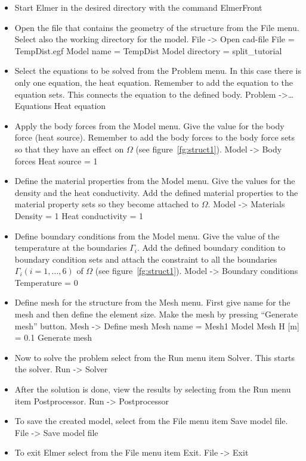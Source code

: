 \begin{itemize}
\item Start Elmer in the desired directory with the command
\ttbegin
ElmerFront
\ttend
\item Open the file that contains the geometry of the structure from 
the File menu. Select also the working directory for the model.
\ttbegin
File -> Open cad-file 
  File = TempDist.egf 
  Model name = TempDist 
  Model directory = split_tutorial
\ttend
\item Select the equations to be solved from the Problem menu. In this 
case there is only one equation, the heat equation. Remember to add the 
equation to the equation sets. This connects the equation to the defined 
body. 
\ttbegin
Problem ->\ldots Equations 
  Heat equation 
\ttend
\item Apply the body forces from the Model menu. Give the value for the body 
force (heat source). Remember to add the body forces to the body force 
sets so that they have an effect on $\Omega$ (see figure~\ref{fg:struct1}). 
\ttbegin
Model -> Body forces 
  Heat source = 1
\ttend
\item Define the material properties from the Model menu. Give the values for 
the density and the heat conductivity. Add the defined material properties 
to the material property sets so they become attached to $\Omega$. 
\ttbegin
Model -> Materials 
  Density = 1 
  Heat conductivity = 1
\ttend
\item Define boundary conditions from the Model menu. Give the value of the 
temperature at the boundaries $\Gamma_i$. Add the defined boundary condition 
to boundary condition sets and attach the constraint to all the boundaries 
$\Gamma_i (i=1,\ldots,6)$ of $\Omega$ (see figure~\ref{fg:struct1}). 
\ttbegin
Model -> Boundary conditions 
  Temperature = 0 
\ttend
\item Define mesh for the structure from the Mesh menu. First give name for 
the mesh and then define the element size. Make the mesh by pressing
``Generate mesh'' button. 
\ttbegin
Mesh -> Define mesh 
  Mesh name = Mesh1 
  Model Mesh H [m] = 0.1 
  Generate mesh
\ttend
\item Now to solve the problem select from the Run menu item Solver. This 
starts the solver. 
\ttbegin
Run -> Solver 
\ttend
\item After the solution is done, view the results by selecting from the Run
menu item Postprocessor. 
\ttbegin
Run -> Postprocessor 
\ttend
\item To save the created model, select from the File menu item Save 
model file. 
\ttbegin
File -> Save model file 
\ttend
\item To exit Elmer select from the File menu item Exit. 
\ttbegin
File -> Exit
\ttend
\end{itemize}

